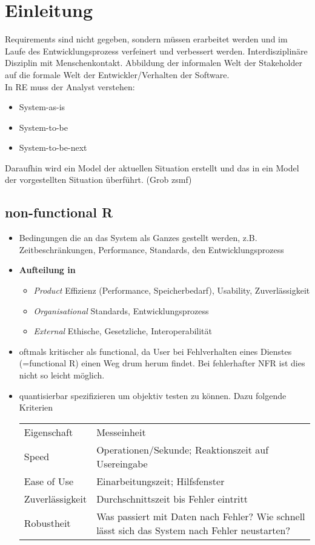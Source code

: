 \section{Einleitung}
Requirements sind nicht gegeben, sondern müssen erarbeitet werden und im Laufe des Entwicklungsprozess verfeinert und verbessert werden.
Interdisziplinäre Disziplin mit Menschenkontakt. Abbildung der informalen Welt der Stakeholder auf die formale Welt der Entwickler/Verhalten der Software.\\
In RE muss der Analyst verstehen:
\begin{itemize}
	\item System-as-is
	\item System-to-be
	\item System-to-be-next
\end{itemize}
Daraufhin wird ein Model der aktuellen Situation erstellt und das in ein Model der vorgestellten Situation überführt. (Grob zsmf)
\subsection{non-functional R}
\begin{itemize}
	\item Bedingungen die an das System als Ganzes gestellt werden, z.B. Zeitbeschränkungen, Performance, Standards, den Entwicklungsprozess
	\item \textbf{Aufteilung in}
	\begin{itemize}
		\item \textit{Product} Effizienz (Performance, Speicherbedarf), Usability, Zuverlässigkeit
		\item \textit{Organisational} Standards, Entwicklungsprozess
		\item \textit{External} Ethische, Gesetzliche, Interoperabilität
	\end{itemize}
	\item oftmals kritischer als functional, da User bei Fehlverhalten eines Dienstes (=functional R) einen Weg drum herum findet. Bei fehlerhafter NFR ist dies nicht so leicht möglich.
	\item quantisierbar spezifizieren um objektiv testen zu können. Dazu folgende Kriterien
	\begin{table}[!h]
		\begin{tabular}{ll}
			Eigenschaft	& Messeinheit\\
			Speed		& Operationen/Sekunde; Reaktionszeit auf Usereingabe\\
			Ease of Use	& Einarbeitungszeit; Hilfsfenster\\
			Zuverlässigkeit & Durchschnittszeit bis Fehler eintritt\\
			Robustheit & Was passiert mit Daten nach Fehler? Wie schnell lässt sich das System nach Fehler neustarten?
		\end{tabular}
	\end{table}
	
\end{itemize}

